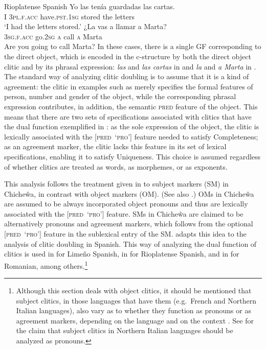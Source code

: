 \documentclass[output=paper,hidelinks]{langscibook}
\begin{document}
\ea\label{ex:Romance:14}  Rioplatense Spanish \citep{Estigarribia2005}
\ea\label{ex:Romance:14a}
\gll
Yo las tenía guardadas las cartas.\\
I \textsc{3pl.f.acc} have.\textsc{pst}.1\textsc{sg} stored the letters\\
\glt   `I had the letters stored.'
\ex\label{ex:Romance:14b}
\gll
¿La vas a llamar a Marta?\\
\textsc{3sg.f.acc} go.2\textsc{sg} \textsc{a} call \textsc{a} Marta\\
\glt   Are you going to call Marta?
\z\z
In these cases, there is a single GF corresponding to the direct object, which is encoded in the c-structure by both the direct object clitic and by its phrasal expression: \textit{las} and \textit{las cartas} in  and \textit{la} and \textit{a Marta} in . The standard way of analyzing clitic doubling is to assume that it is a kind of agreement: the clitic in examples such as  merely specifies the formal features of person, number and gender of the object, while the corresponding phrasal expression contributes, in addition, the semantic \textsc{pred} feature of the object. This means that there are two sets of specifications associated with clitics that have the dual function exemplified in : as the sole expression of the object, the clitic is lexically associated with the {[\textsc{pred}~`\textsc{pro}']}  feature needed to satisfy Completeness; as an agreement marker, the clitic lacks this feature in its set of lexical specifications, enabling it to satisfy Uniqueness. This choice is assumed regardless of whether clitics are treated as words, as morphemes, or as exponents.

This analysis follows the treatment given in \citet{BM87} to subject markers (SM) in Chiche\^wa, in contrast with object markers (OM). (See also \citealt{FassiFehri1984,FF}.) OMs in Chiche\^wa are assumed to be always incorporated object pronouns and thus are lexically associated with the {[\textsc{pred}~`\textsc{pro}']} feature. SMs in Chiche\^wa are claimed to be alternatively pronouns and agreement markers, which follows from the optional {[\textsc{pred}~`\textsc{pro}']} feature in the sublexical entry of the SM. \citet{Andrews90} adapts this idea to the analysis of clitic doubling in Spanish. This way of analyzing the dual function of clitics is used in \citet{Mayer06} for Limeño Spanish, in \citet{Estigarribia2013} for Rioplatense Spanish, and in \citet{BarbuToivonen2018} for Romanian, among others.\footnote{Although this section deals with object clitics, it should be mentioned that subject clitics, in those languages that have them (e.g.\ French and Northern Italian languages), also vary as to whether they function as pronouns or as agreement markers, depending on the language and on the context \citep{PolettoTortora2016}. See \citet{CardinalettiRepetti2010} for the claim that subject clitics in Northern Italian languages should be analyzed as pronouns.}
\end{document}
